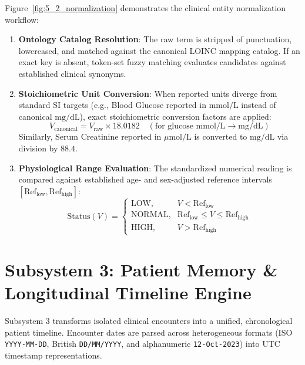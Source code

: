 Figure~\ref{fig:5_2_normalization} demonstrates the clinical entity normalization workflow:
\begin{enumerate}
    \item \textbf{Ontology Catalog Resolution}: The raw term is stripped of punctuation, lowercased, and matched against the canonical LOINC mapping catalog. If an exact key is absent, token-set fuzzy matching evaluates candidates against established clinical synonyms.
    \item \textbf{Stoichiometric Unit Conversion}: When reported units diverge from standard SI targets (e.g., Blood Glucose reported in $\text{mmol/L}$ instead of canonical $\text{mg/dL}$), exact stoichiometric conversion factors are applied:
    \begin{equation}
        V_{\text{canonical}} = V_{\text{raw}} \times 18.0182 \quad (\text{for glucose } \text{mmol/L} \rightarrow \text{mg/dL})
    \end{equation}
    Similarly, Serum Creatinine reported in $\mu\text{mol/L}$ is converted to $\text{mg/dL}$ via division by $88.4$.
    \item \textbf{Physiological Range Evaluation}: The standardized numerical reading is compared against established age- and sex-adjusted reference intervals $[\text{Ref}_{\text{low}}, \text{Ref}_{\text{high}}]$:
    \begin{equation}
        \text{Status}(V) = \begin{cases}
            \text{LOW}, & V < \text{Ref}_{\text{low}} \\
            \text{NORMAL}, & \text{Ref}_{\text{low}} \le V \le \text{Ref}_{\text{high}} \\
            \text{HIGH}, & V > \text{Ref}_{\text{high}}
        \end{cases}
    \end{equation}
\end{enumerate}


\section{Subsystem 3: Patient Memory \& Longitudinal Timeline Engine}
\label{sec:impl_subsystem_timeline}

Subsystem 3 transforms isolated clinical encounters into a unified, chronological patient timeline. Encounter dates are parsed across heterogeneous formats (ISO \texttt{YYYY-MM-DD}, British \texttt{DD/MM/YYYY}, and alphanumeric \texttt{12-Oct-2023}) into UTC timestamp representations. 


